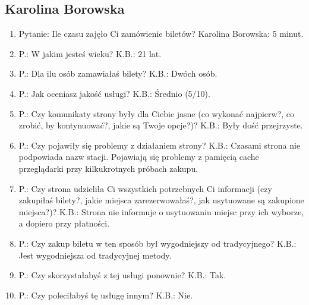 \documentclass{article}
\begin{document}
\subsection{Karolina Borowska}
\begin{enumerate}
\item Pytanie: Ile czasu zajęło Ci zamówienie biletów? \newline
Karolina Borowska: 5 minut.
\item P.: W jakim jesteś wieku? \newline
K.B.: 21 lat.
\item P.: Dla ilu osób zamawiałaś bilety? \newline
K.B.: Dwóch osób.
\item P.: Jak oceniasz jakość usługi? \newline
K.B.: Średnio (5/10).
\item P.: Czy komunikaty strony były dla Ciebie jasne (co wykonać najpierw?, co zrobić, by kontynuować?, jakie są Twoje opcje?)? \newline
K.B.: Były dość przejrzyste.
\item P.: Czy pojawiły się problemy z działaniem strony? \newline
K.B.: Czasami strona nie podpowiada nazw stacji. Pojawiają się problemy z pamięcią cache przeglądarki przy kilkukrotnych próbach zakupu.
\item P.: Czy strona udzieliła Ci wszystkich potrzebnych Ci informacji (czy zakupiłaś bilety?, jakie miejsca zarezerwowałaś?, jak usytuowane są zakupione miejsca?)? \newline
K.B.: Strona nie informuje o usytuowaniu miejsc przy ich wyborze, a dopiero przy płatności.
\item P.: Czy zakup biletu w ten sposób był wygodniejszy od tradycyjnego? \newline
K.B.: Jest wygodniejsza od tradycyjnej metody.
\item P.: Czy skorzystałabyś z tej usługi ponownie? \newline
K.B.: Tak.
\item P.: Czy poleciłabyś tę usługę innym? \newline
K.B.: Nie.
\end{enumerate}
\end{document}
